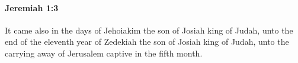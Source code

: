 
		\paragraph{Jeremiah 1:3} %
			\label{JEREMIAH-1-3}

			It came also in the days of Jehoiakim the son of Josiah king of Judah, unto the end of the eleventh year of Zedekiah the son of Josiah king of Judah, unto the carrying away of Jerusalem captive in the fifth month.


